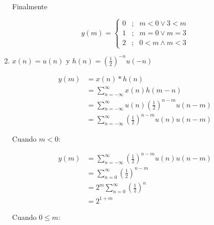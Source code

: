 \documentclass[a4paper,12pt,final]{article}
\begin{document}
\begin{enumerate}[label=\alph*)]
          \noindent Finalmente

          \begin{equation*}
            y\left(m\right) = \left\{
              \begin{array}{lcl}
                0 &;& m < 0  \vee  3 < m \\ [1em]
                1 &;& m = 0  \vee  m = 3 \\ [1em]
                2 &;& 0 < m \wedge m < 3
              \end{array}
            \right.
          \end{equation*}
          \vfill
          \newpage

        \item $x\left(n\right) = u\left(n\right)$ y $h\left(n\right) = \left(\frac{1}{2}\right)^{-n} u\left(-n\right)$

          \begin{equation*}
            \begin{split}
              y\left(m\right) & = x\left(n\right) * h\left(n\right) \\
                              & = \sum_{n=-\infty}^{\infty} x\left(n\right)h\left(m-n\right) \\
                              & = \sum_{n=-\infty}^{\infty} u\left(n\right) \left(\frac{1}{2}\right)^{n-m} u\left(n-m\right) \\
                              & = \sum_{n=-\infty}^{\infty} \left(\frac{1}{2}\right)^{n-m} u\left(n\right) u\left(n-m\right)
            \end{split}
          \end{equation*}

          \noindent Cuando $m < 0$:

          \begin{equation*}
            \begin{split}
              y\left(m\right) & = \sum_{n=-\infty}^{\infty} \left(\frac{1}{2}\right)^{n-m} u\left(n\right) u\left(n-m\right) \\
                              & = \sum_{n=0}^{\infty} \left(\frac{1}{2}\right)^{n-m} \\
                              & = 2^{m} \sum_{n=0}^{\infty} \left(\frac{1}{2}\right)^{n} \\
                              & = 2^{1+m}
            \end{split}
          \end{equation*}

          \noindent Cuando $0 \leq m$:


\end{enumerate}
\end{document}
